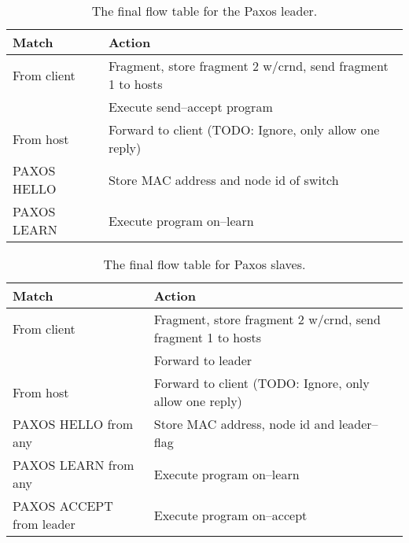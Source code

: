 \begin{table}[H]
  \centering
  \begin{tabular}{|l|l|}
    \hline \textbf{Match} & \textbf{Action} \\
    \hline From client & Fragment, store fragment 2 w/crnd, send fragment 1 to hosts \\
                       & Execute send--accept program \\
    \hline From host & Forward to client (TODO: Ignore, only allow one reply) \\
    \hline PAXOS HELLO & Store MAC address and node id of switch \\
    \hline PAXOS LEARN & Execute program on--learn \\
    \hline
  \end{tabular}
  \caption{The final flow table for the Paxos leader.}
  \label{table:complete.match.leader}
\end{table}

\begin{table}[H]
  \centering
  \begin{tabular}{|l|l|}
    \hline \textbf{Match} & \textbf{Action} \\
    \hline From client & Fragment, store fragment 2 w/crnd, send fragment 1 to hosts \\
                       & Forward to leader \\
    \hline From host & Forward to client (TODO: Ignore, only allow one reply) \\
    \hline PAXOS HELLO from any & Store MAC address, node id and leader--flag \\
    \hline PAXOS LEARN from any & Execute program on--learn \\
    \hline PAXOS ACCEPT from leader & Execute program on--accept \\
    \hline
  \end{tabular}
  \caption{The final flow table for Paxos slaves.}
  \label{table:complete.match.slave}
\end{table}

